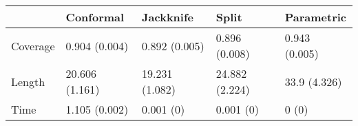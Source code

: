\begin{tabular}{|l|l|l|l|l|}
\hline
& Conformal & Jackknife & Split & Parametric \\
\hline
Coverage & 0.904 (0.004) & 0.892 (0.005) & 0.896 (0.008) & 0.943 (0.005) \\
\hline
Length & 20.606 (1.161) & 19.231 (1.082) & 24.882 (2.224) & 33.9 (4.326) \\
\hline
Time & 1.105 (0.002) & 0.001 (0) & 0.001 (0) & 0 (0) \\
\hline
\end{tabular}
